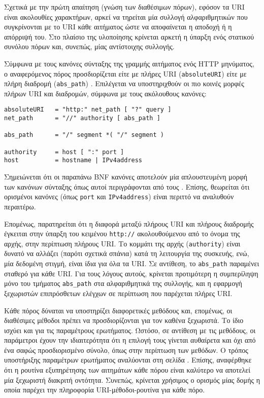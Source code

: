Σχετικά με την πρώτη απαίτηση (γνώση των διαθέσιμων πόρων),
εφόσον τα URI είναι ακολουθίες χαρακτήρων, αρκεί να τηρείται μία συλλογή
αλφαριθμητικών που συγκρίνονται με το URI κάθε αιτήματος ώστε να αποφαίνεται η
αποδοχή ή η απόρριψή του. Στο πλαίσιο της υλοποίησης κρίνεται αρκετή η ύπαρξη
ενός στατικού συνόλου πόρων και, συνεπώς, μίας αντίστοιχης συλλογής.

Σύμφωνα με τους κανόνες σύνταξης της γραμμής αιτήματος ενός HTTP μηνύματος, ο
αναφερόμενος πόρος προσδιορίζεται είτε με πλήρες URI (\verb~absoluteURI~) είτε
με πλήρη διαδρομή (\verb~abs_path~) \parencite[36--37]{rfc2616}.
Επιλέγεται να υποστηριχθούν οι πιο κοινές μορφές πλήρων URI και διαδρομών,
σύμφωνα με τους ακόλουθους κανόνες:
\begin{lstlisting}
absoluteURI   = "http:" net_path [ "?" query ]
net_path      = "//" authority [ abs_path ]

abs_path      = "/" segment *( "/" segment )

authority     = host [ ":" port ]
host          = hostname | IPv4address
\end{lstlisting}
Σημειώνεται ότι οι παραπάνω BNF κανόνες αποτελούν μία απλουστευμένη μορφή των
κανόνων σύνταξης όπως αυτοί περιγράφονται από τους \textcite[27--28]{rfc2396}.
Επίσης, θεωρείται ότι ορισμένοι κανόνες (όπως \verb~port~ και 
\verb~IPv4address~) είναι περιττό να αναλυθούν περαιτέρω.

Επομένως, παρατηρείται ότι η διαφορά μεταξύ πλήρους URI και πλήρους διαδρομής
έγκειται στην ύπαρξη του κειμένου \verb~http://~ ακολουθούμενου από το όνομα της
αρχής, στην περίπτωση πλήρους URI. Το κομμάτι της αρχής (\verb~authority~) είναι
δυνατό να αλλάζει (παρότι σχετικά σπάνια) κατά τη λειτουργία της συσκευής, ενώ,
μία δεδομένη στιγμή, είναι ίδια για όλα τα URI. Σε αντίθεση, το \verb~abs_path~
παραμένει σταθερό για κάθε URI. Για τους λόγους αυτούς, κρίνεται προτιμότερη η
συμπερίληψη μόνο του τμήματος \verb~abs_path~ στα αλφαριθμητικά της συλλογής,
και η εφαρμογή ξεχωριστών επιπρόσθετων ελέγχων σε περίπτωση που παρέχεται πλήρες
URI.

Κάθε πόρος δύναται να υποστηρίζει διαφορετικές μεθόδους και, επομένως, οι
διαθέσιμες μέθοδοι πρέπει να προσδιορίζονται για τον καθένα ξεχωριστά. Το ίδιο
ισχύει και για τις παραμέτρους ερωτήματος. Ωστόσο, σε αντίθεση με τις μεθόδους,
οι παράμετροι έχουν την ιδιαιτερότητα ότι η επιλογή τους γίνεται αυθαίρετα και
όχι από ένα σαφώς προσδιορισμένο σύνολο, όπως στην περίπτωση των μεθόδων. Ο
τρόπος υποστήριξης παραμέτρων ερωτήματος αναλύονται στη σελίδα
\pageref{ssubsec:network:query-string}.
Επίσης, αναφέρθηκε ότι η ρουτίνα εξυπηρέτησης των αιτημάτων κάθε πόρου είναι
καλύτερο να αποτελεί μία ξεχωριστή διακριτή οντότητα. Συνεπώς, κρίνεται χρήσιμος
ο ορισμός μίας δομής η οποία παρέχει την πληροφορία URI-μέθοδοι-ρουτίνα για κάθε
πόρο.

